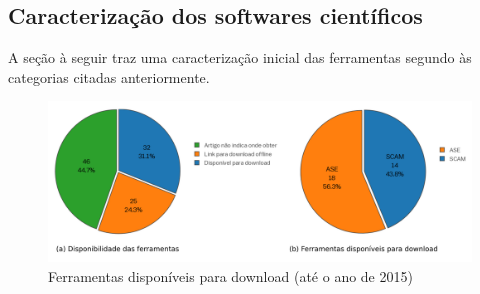 \subsection{Caracterização dos softwares científicos}

A seção à seguir traz uma caracterização inicial das ferramentas segundo às
categorias citadas anteriormente.

\begin{figure}[h]
  \center
  \includegraphics[scale=0.85]{imagens/ferramentas-disponiveis.png}
  \caption{Ferramentas disponíveis para download (até o ano de 2015)}
  \label{ferramentas-disponiveis}
\end{figure}

